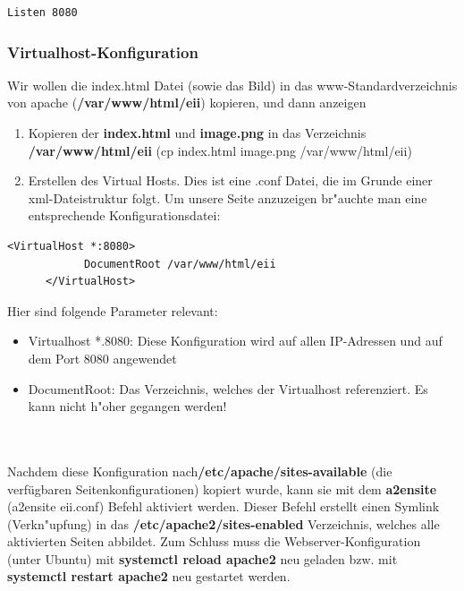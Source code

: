 \documentclass[a4paper,11pt,titlepage]{article}
\begin{document}
    \begin{lstlisting}[caption={ports.conf},label={lst:lstlisting}]
        Listen 8080
    \end{lstlisting}

    \subsubsection{Virtualhost-Konfiguration}
    Wir wollen die index.html Datei (sowie das Bild) in das www-Standardverzeichnis von apache (\textbf{/var/www/html/eii}) kopieren, und dann anzeigen
    \begin{enumerate}
        \item Kopieren der \textbf{index.html} und \textbf{image.png} in das Verzeichnis \textbf{/var/www/html/eii} (cp index.html image.png /var/www/html/eii)
        \item Erstellen des Virtual Hosts. Dies ist eine .conf Datei, die im Grunde einer xml-Dateistruktur folgt. Um unsere Seite anzuzeigen br"auchte man eine entsprechende Konfigurationsdatei:
    \end{enumerate}

    \begin{lstlisting}[caption={eii.conf},label={lst:lstlisting-2}]
      <VirtualHost *:8080>
            DocumentRoot /var/www/html/eii
      </VirtualHost>
    \end{lstlisting}

    Hier sind folgende Parameter relevant:
    \begin{itemize}
        \item Virtualhost *.8080: Diese Konfiguration wird auf allen IP-Adressen und auf dem Port 8080 angewendet
        \item DocumentRoot: Das Verzeichnis, welches der Virtualhost referenziert. Es kann nicht h"oher gegangen werden!
    \end{itemize}
    \\ \\
    Nachdem diese Konfiguration nach\textbf{/etc/apache/sites-available} (die verfügbaren Seitenkonfigurationen) kopiert wurde, kann sie mit dem \textbf{a2ensite} (a2ensite eii.conf) Befehl aktiviert werden. Dieser Befehl erstellt einen Symlink (Verkn"upfung) in das \textbf{/etc/apache2/sites-enabled} Verzeichnis, welches alle aktivierten Seiten abbildet.
    Zum Schluss muss die Webserver-Konfiguration (unter Ubuntu) mit \textbf{systemctl reload apache2} neu geladen bzw. mit \textbf{systemctl restart apache2} neu gestartet werden.
\end{document}
